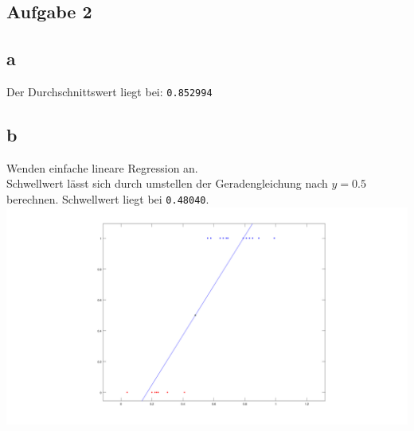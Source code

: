 \documentclass[a4paper,10pt]{article}
\begin{document}
\subsection*{Aufgabe 2}
	\subsection*{a}
		Der Durchschnittswert liegt bei: \texttt{0.852994}

	\subsection*{b}
		Wenden einfache lineare Regression an.\\
		Schwellwert lässt sich durch umstellen der Geradengleichung
		nach $y = 0.5$ berechnen. Schwellwert liegt bei \texttt{0.48040}.\\
		\includegraphics[scale=0.35]{aufg2b}
	
\end{document}
